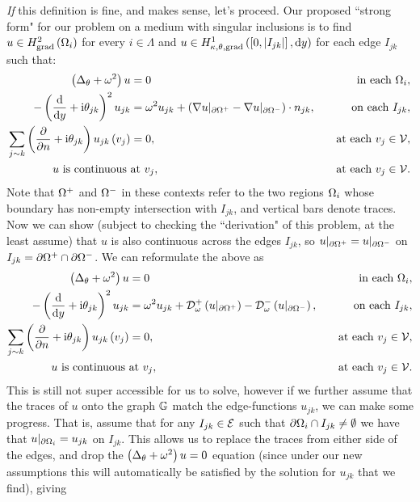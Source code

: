\documentclass[11pt]{report}
\newcommand{\dtn}{\mathcal{D}_\omega}
\begin{document}
\emph{If} this definition is fine, and makes sense, let's proceed.
Our proposed ``strong form" for our problem on a medium with singular inclusions is to find $u\in H^2_{\mathrm{grad}}\left( \Omega_i \right)$ for every $i\in\Lambda$ and $u\in H^1_{\kappa,\theta,\mathrm{grad}}\left( \left[ 0,\left\lvert I_{jk} \right\rvert \right], \mathrm{d}y \right)$ for each edge $I_{jk}$ such that:
\begin{align*}
	\left( \Delta_\theta + \omega^2 \right)u &= 0 \quad &\text{in each } \Omega_i, \\
	-\left( \dfrac{\mathrm{d}}{\mathrm{d}y}+\mathrm{i}\theta_{jk} \right)^2 u_{jk} &= \omega^2 u_{jk} + \left( \nabla u\vert_{\partial\Omega^+} - \nabla u\vert_{\partial\Omega^-} \right)\cdot n_{jk}, \quad &\text{on each } I_{jk}, \\
	\sum_{j\sim k}\left( \dfrac{\partial }{\partial n} + \mathrm{i}\theta_{jk} \right)u_{jk}\left( v_j \right) &= 0, \quad &\text{at each } v_j\in\mathcal{V}, \\
	u \text{ is continuous } & \text{at } v_j, \quad &\text{at each } v_j\in\mathcal{V}.
\end{align*}
Note that $\Omega^+$ and $\Omega^-$ in these contexts refer to the two regions $\Omega_i$ whose boundary has non-empty intersection with $I_{jk}$, and vertical bars denote traces.
Now we can show (subject to checking the ``derivation" of this problem, at the least assume) that $u$ is also continuous across the edges $I_{jk}$, so $u\vert_{\partial\Omega^{+}} = u\vert_{\partial\Omega^{-}}$ on $I_{jk} = \partial\Omega^{+} \cap \partial\Omega^{-}$.
We can reformulate the above as
\begin{align*}
	\bracs{\laplacian_\qm + \omega^2}u &= 0 \quad &\text{in each } \ddom_i, \\
	-\bracs{\diff{}{y}+\rmi\qm_{jk}}^2 u_{jk} &= \omega^2 u_{jk} + \dtn^+ \bracs{u\vert_{\partial\ddom^+}} - \dtn^- \bracs{u\vert_{\partial\ddom^-}}, \quad &\text{on each } I_{jk}, \\
	\sum_{j\con k}\bracs{\pdiff{}{n} + \rmi\qm_{jk}}u_{jk}\bracs{v_j} &= 0, \quad &\text{at each } v_j\in\vertSet, \\
	u \text{ is continuous } & \text{at } v_j, \quad &\text{at each } v_j\in\vertSet.
\end{align*}
This is still not super accessible for us to solve, however if we further assume that the traces of $u$ onto the graph $\mathbb{G}$ match the edge-functions $u_{jk}$, we can make some progress.
That is, assume that for any $I_{jk}\in\mathcal{E}$ such that $\partial\Omega_i\cap I_{jk}\neq\emptyset$ we have that $u\vert_{\partial\Omega_i} = u_{jk}$ on $I_{jk}$.
This allows us to replace the traces from either side of the edges, and drop the $\left( \Delta_\theta + \omega^2 \right)u = 0$ equation (since under our new assumptions this will automatically be satisfied by the solution for $u_{jk}$ that we find), giving
\end{document}
